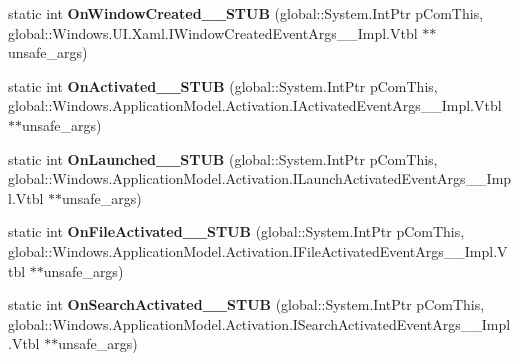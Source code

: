 \begin{DoxyCompactItemize}
\mbox{\label{struct_windows_1_1_u_i_1_1_xaml_1_1_i_application_overrides_____impl_1_1_vtbl_a9afed578176233dce858655f137f848e}} 
static int {\bfseries On\+Window\+Created\+\_\+\+\_\+\+S\+T\+UB} (global\+::\+System.\+Int\+Ptr p\+Com\+This, global\+::\+Windows.\+U\+I.\+Xaml.\+I\+Window\+Created\+Event\+Args\+\_\+\+\_\+\+Impl.\+Vtbl $\ast$$\ast$unsafe\+\_\+args)
\item 
\mbox{\label{struct_windows_1_1_u_i_1_1_xaml_1_1_i_application_overrides_____impl_1_1_vtbl_ad7464db51bad65770e0db03c4757bea2}} 
static int {\bfseries On\+Activated\+\_\+\+\_\+\+S\+T\+UB} (global\+::\+System.\+Int\+Ptr p\+Com\+This, global\+::\+Windows.\+Application\+Model.\+Activation.\+I\+Activated\+Event\+Args\+\_\+\+\_\+\+Impl.\+Vtbl $\ast$$\ast$unsafe\+\_\+args)
\item 
\mbox{\label{struct_windows_1_1_u_i_1_1_xaml_1_1_i_application_overrides_____impl_1_1_vtbl_a944ece0dc877dd124e6eef44bd7f1aea}} 
static int {\bfseries On\+Launched\+\_\+\+\_\+\+S\+T\+UB} (global\+::\+System.\+Int\+Ptr p\+Com\+This, global\+::\+Windows.\+Application\+Model.\+Activation.\+I\+Launch\+Activated\+Event\+Args\+\_\+\+\_\+\+Impl.\+Vtbl $\ast$$\ast$unsafe\+\_\+args)
\item 
\mbox{\label{struct_windows_1_1_u_i_1_1_xaml_1_1_i_application_overrides_____impl_1_1_vtbl_a701f7d1d809e7a764cf38c898b0faca9}} 
static int {\bfseries On\+File\+Activated\+\_\+\+\_\+\+S\+T\+UB} (global\+::\+System.\+Int\+Ptr p\+Com\+This, global\+::\+Windows.\+Application\+Model.\+Activation.\+I\+File\+Activated\+Event\+Args\+\_\+\+\_\+\+Impl.\+Vtbl $\ast$$\ast$unsafe\+\_\+args)
\item 
\mbox{\label{struct_windows_1_1_u_i_1_1_xaml_1_1_i_application_overrides_____impl_1_1_vtbl_a9d3f155c56d99f66129cb2eda5656074}} 
static int {\bfseries On\+Search\+Activated\+\_\+\+\_\+\+S\+T\+UB} (global\+::\+System.\+Int\+Ptr p\+Com\+This, global\+::\+Windows.\+Application\+Model.\+Activation.\+I\+Search\+Activated\+Event\+Args\+\_\+\+\_\+\+Impl.\+Vtbl $\ast$$\ast$unsafe\+\_\+args)
$$
\end{DoxyCompactItemize}
